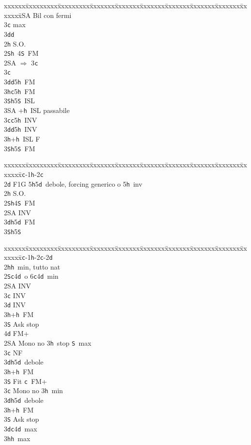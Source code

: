 \documentclass[a4paper,italian]{article}
\newcommand{\BS}{\small{\texttt{S}}}
\newcommand{\BC}{\small{\texttt{c}}}
\newcommand{\BD}{\small{\texttt{d}}}
\newcommand{\BH}{\small{\texttt{h}}}
\newenvironment{bidtable}
{\begin{tabbing}

    xxxxxx\=xxxxxxxxx\=xxxxxxxxx\=xxxxxxx\=xxxxxxx\=xxxxxxx\=xxxxxxx\=xxxxxxx\=xxxxxxx\=xxxxxxx\=\kill}
{\end{tabbing} }%
\begin{document}
\begin{multicols}{2}
\begin{bidtable}
        2\small{SA} \> Bil con fermi\\
        3\BC {} max\\
        3\BD {}\BD \-\\
        [2pt]2\BH \> S.O.\\
        [2pt]2\BS {}\BH\ 4\BS\ FM\\
        2\small{SA} \> $\Rightarrow$ 3\BC \+\\
        3\BC\+\\
        3\BD {}\BD 5\BH\ FM\\
        3\BH {}\BC 5\BH\ FM\\
        3\BS {}\BH 5\BS\ ISL\\
        3\small{SA} +\BH\ ISL passabile\-\-\\
        3\BC {}\BC 5\BH\ INV\\
        3\BD {}\BD 5\BH\ INV\\
        3\BH {}+\BH\ ISL F\\
        3\BS {}\BH 5\BS\ FM\-
    \end{bidtable}
    \bigbreak
    \begin{bidtable}
        1\BC-1\BH-2\BC\+\\
        2\BD \> F1G 5\BH 5\BD\ debole, forcing generico o 5\BH\ inv\\
        2\BH \> S.O.\\
        2\BS {}\BH 4\BS\ FM\\
        2\small{SA} \> INV\\
        3\BD {}\BH 5\BD\ FM\\
        3\BS {}\BH 5\BS \-
    \end{bidtable}
    \bigbreak
    \begin{bidtable}
        1\BC-1\BH-2\BC-2\BD\+\\
        2\BH {}\BH\ min, tutto nat\\
        2\BS {}\BC 4\BD\ o 6\BC 4\BD\ min\+\\
        2\small{SA} \> INV\\
        3\BC \> INV\\
        3\BD \> INV\\
        3\BH {}+\BH\ FM\\
        3\BS \> Ask stop\\
        4\BD \> FM+\-\\
        2\small{SA} \> Mono no 3\BH\ stop \BS\ max\+\\
        3\BC \> NF\\
        3\BD {}\BH 5\BD\ debole\\
        3\BH {}+\BH\ FM\\
        3\BS \> Fit \BC\ FM+\-\\
        3\BC \> Mono no 3\BH\ min\+\\
        3\BD {}\BH 5\BD\ debole\\
        3\BH {}+\BH\ FM\\
        3\BS \> Ask stop\-\\
        3\BD {}\BC 4\BD\ max\\
        3\BH {}\BH\ max\-
    \end{bidtable}


\end{multicols}
\end{document}
